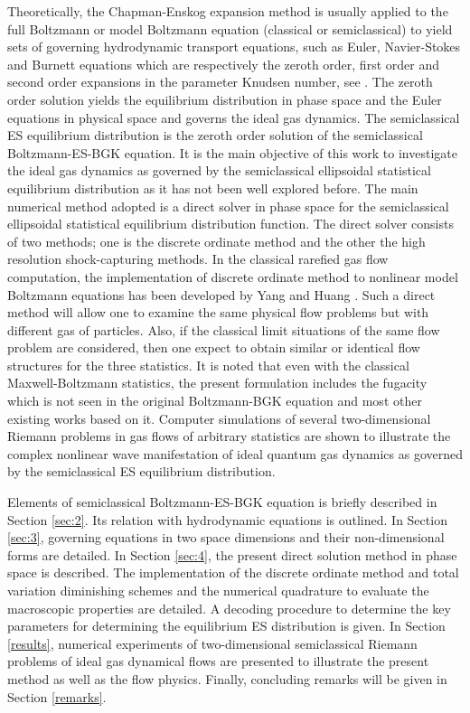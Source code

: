 \documentclass{rsproca}%
\begin{document}
Theoretically, the Chapman-Enskog expansion method is usually applied to the full Boltzmann or model Boltzmann equation (classical or semiclassical) to yield sets of governing hydrodynamic transport equations, such as Euler, Navier-Stokes and Burnett equations which are respectively the zeroth order, first order and second order expansions in the parameter Knudsen number,  see \cite{Cowling1970}.   The zeroth order solution yields the equilibrium distribution in phase space and the Euler equations in physical space and governs the ideal gas dynamics.  The semiclassical ES equilibrium distribution is the zeroth order solution of the semiclassical Boltzmann-ES-BGK equation.  It is the main objective of this work to investigate the ideal gas dynamics as governed by the semiclassical ellipsoidal statistical equilibrium distribution as it has not been well explored before.   The main numerical method adopted is a direct solver in phase space for the semiclassical ellipsoidal statistical equilibrium distribution function.  The direct solver consists of two methods; one is the discrete ordinate method and the other the high resolution shock-capturing methods.   In the classical rarefied gas flow computation, the implementation of discrete ordinate method to nonlinear model Boltzmann equations has been developed by Yang and Huang \cite{Yang1995323}.  Such a direct method will allow one to examine the same physical flow problems but with different gas of particles.   Also, if the classical limit situations of the same flow problem are considered, then one expect to obtain similar or identical flow structures for the three statistics.   It is noted that even with the classical Maxwell-Boltzmann statistics, the present formulation includes the fugacity which is not seen in the original Boltzmann-BGK equation \cite{PhysRev.94.511} and most other existing works based on it.  Computer simulations of several two-dimensional Riemann problems in gas flows of arbitrary statistics are shown to illustrate the complex nonlinear wave manifestation of ideal quantum gas dynamics as governed by the semiclassical ES equilibrium distribution.


Elements of semiclassical Boltzmann-ES-BGK equation is briefly described in Section \ref{sec:2}. Its relation with hydrodynamic equations is outlined. In Section \ref{sec:3}, governing equations in two space dimensions and their non-dimensional forms are detailed. In Section \ref{sec:4}, the present direct solution method in phase space is described.   The implementation of the discrete ordinate method and total variation diminishing schemes and the numerical quadrature to evaluate the macroscopic properties are detailed.   A decoding procedure to determine the key parameters for determining the equilibrium ES distribution is given.  In Section \ref{results}, numerical experiments of two-dimensional semiclassical Riemann problems of ideal gas dynamical flows are presented to illustrate the present method as well as the flow physics. Finally, concluding remarks will be given in Section \ref{remarks}.
\end{document}
